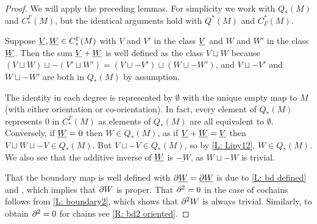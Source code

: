\begin{proof}
	We will apply the preceding lemmas.
	For simplicity we work with $Q_*(M)$ and $C^\Gamma_*(M)$, but the identical arguments hold with $Q^*(M)$ and $C_\Gamma^*(M)$.

	Suppose $\underline{V},\underline{W} \in C^\Gamma_*(M)$ with $V$ and $V'$ in the class $\underline{V}$ and $W$ and $W'$ in the class $\underline{W}$.
	Then the sum $\underline{V}+\underline{W}$ is well defined as the class $\underline{V \sqcup W}$ because $(V \sqcup W) \sqcup -(V' \sqcup W') = (V \sqcup -V') \sqcup (W \sqcup -W')$, and $V \sqcup -V'$ and $W \sqcup -W'$ are both in $Q_*(M)$ by assumption.

	The identity in each degree is represented by $\emptyset$ with the unique empty map to $M$ (with either orientation or co-orientation).
	In fact, every element of $Q_*(M)$ represents $0$ in $C^\Gamma_*(M)$ as elements of $Q_*(M)$ are all equivalent to $\emptyset$.
	Conversely, if $\underline{W} = 0$ then $W \in Q_*(M)$, as if $\underline{V}+\underline{W} = \underline{V}$ then $V \sqcup W \sqcup -V \in Q_*(M)$.
	But $V \sqcup -V \in Q_*(M)$, so by \cref{L: Lipy12}, $W \in Q_*(M)$.
	We also see that the additive inverse of $\underline{W}$ is $\underline{-W}$, as $W \sqcup -W$ is trivial.

	That the boundary map is well defined with $\partial \underline{W} = \underline{\partial W}$ is due to \cref{L: bd defined} and \cite[Lemma 2.8]{Joy12}, which implies that $\partial W$ is proper.
	That $\partial^2 = 0$ in the case of cochains follows from \cref{L: boundary2}, which shows that $\partial^2 W$ is always trivial.
	Similarly, to obtain $\partial^2 = 0$ for chains see \cref{R: bd2 oriented}.
\end{proof}

